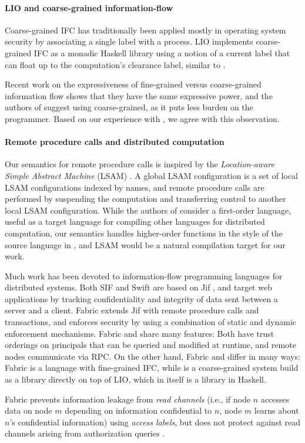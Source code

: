 \paragraph{LIO and coarse-grained information-flow}
Coarse-grained IFC has traditionally been applied mostly in operating system security \cite{Zeldovich:2006:MIF:1267308.1267327, Krohn:2007:IFC:1294261.1294293} by associating a single label with a process. LIO \cite{SRMMlio} implements coarse-grained IFC as a monadic Haskell library using a notion of a current label that can float up to the computation's clearance label, similar to \lang.

Recent work \cite{Rajani2018, Vassena2019} on the expressiveness of fine-grained versus coarse-grained information flow shows that they have the same expressive power, and the authors of \cite{Rajani2018} suggest using coarse-grained, as it puts less burden on the programmer. Based on our experience with \lang{}, we agree with this observation.

\paragraph{Remote procedure calls and distributed computation}
Our semantics for remote procedure calls is inspired by the \emph{Location-aware Simple Abstract Machine} (LSAM) \cite{10.1007/978-3-642-25462-8_28}. A global LSAM configuration is a set of local LSAM configurations indexed by names, and remote procedure calls are performed by suspending the computation and transferring control to another local LSAM configuration. While the authors of \cite{10.1007/978-3-642-25462-8_28} consider a first-order language, useful as a target language for compiling other languages for distributed computation, our semantics handles higher-order functions in the style of the source language in \cite{Cooper:2009:RC:1599410.1599439}, and LSAM would be a natural compilation target for our work.

Much work has been devoted to information-flow programming languages for distributed systems. Both SIF \cite{Chong:2007:SEC:1362903.1362904} and Swift \cite{Chong:2007:SWA:1294261.1294265} are based on Jif \cite{Myers:1999:JPM:292540.292561}, and target web applications by tracking confidentiality and integrity of data sent between a server and a client. Fabric \cite{Liu:2009:FPS:1629575.1629606} extends Jif with remote procedure calls and transactions, and enforces security by using a combination of static and dynamic enforcement mechanisms. Fabric and \lang{} share many features: Both have trust orderings on principals that can be queried and modified at runtime, and remote nodes communicate via RPC. On the other hand, Fabric and \lang{} differ in many ways: Fabric is a language with fine-grained IFC, while \lang{} is a coarse-grained system build as a library directly on top of LIO, which in itself is a library in Haskell.

Fabric prevents information leakage from \emph{read channels} (i.e., if node $n$ accesses data on node $m$ depending on information confidential to $n$, node $m$ learns about $n$'s confidential information) using \emph{access labels}, but does not protect against read channels arising from authorization queries \cite{Arden:2015:FA:2859845.2859998}.